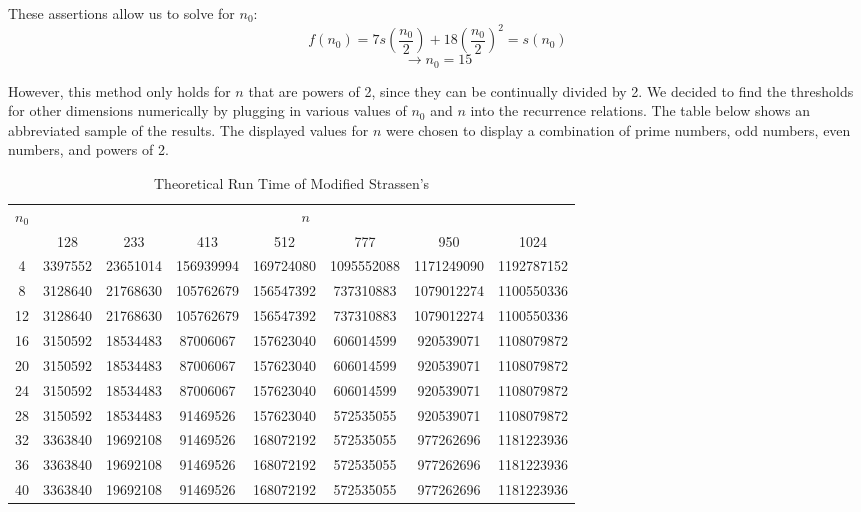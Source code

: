 \documentclass[12pt]{article}
\begin{document}
These assertions allow us to solve for $n_0$:
$$f(n_0) = 7s\left(\frac{n_0}{2}\right) + 18\left(\frac{n_0}{2}\right)^2 = s(n_0)$$
$$\longrightarrow n_0 = 15$$

However, this method only holds for $n$ that are powers of 2, since they can be continually divided by 2. We decided to find the thresholds for other dimensions numerically by plugging in various values of $n_0$ and $n$ into the recurrence relations. The table below shows an abbreviated sample of the results. The displayed values for $n$ were chosen to display a combination of prime numbers, odd numbers, even numbers, and powers of 2.\\

\begin{table}[h!]
\centering
\renewcommand{\arraystretch}{1.2}
{\setlength{\tabcolsep}{5pt}
\begin{tabular}{c|c|c|c|c|c|c|c}
\multirow{2}{*}{$n_0$} & \multicolumn{7}{c}{$n$}\\ \cline{2-8}
& 128 & 233 & 413 & 512 & 777 & 950 & 1024 \\ \hline
4 & 3397552 & 23651014 & 156939994 & 169724080 & 1095552088 & 1171249090 & 1192787152 \\
8 & \cellcolor{green}3128640 & 21768630 & 105762679 & \cellcolor{green}156547392 & 737310883 & 1079012274 & \cellcolor{green}1100550336 \\
12 & \cellcolor{green}3128640 & 21768630 & 105762679 & \cellcolor{green}156547392 & 737310883 & 1079012274 & \cellcolor{green}1100550336 \\
16 & 3150592 & \cellcolor{green}18534483 & \cellcolor{green}87006067 & 157623040 & 606014599 & \cellcolor{green}920539071 & 1108079872 \\
20 & 3150592 & \cellcolor{green}18534483 & \cellcolor{green}87006067 & 157623040 & 606014599 & \cellcolor{green}920539071 & 1108079872 \\
24 & 3150592 & \cellcolor{green}18534483 & \cellcolor{green}87006067 & 157623040 & 606014599 & \cellcolor{green}920539071 & 1108079872 \\
28 & 3150592 & \cellcolor{green}18534483 & 91469526 & 157623040 & \cellcolor{green}572535055 & \cellcolor{green}920539071 & 1108079872 \\
32 & 3363840 & 19692108 & 91469526 & 168072192 & \cellcolor{green}572535055 & 977262696 & 1181223936 \\
36 & 3363840 & 19692108 & 91469526 & 168072192 & \cellcolor{green}572535055 & 977262696 & 1181223936 \\
40 & 3363840 & 19692108 & 91469526 & 168072192 & \cellcolor{green}572535055 & 977262696 & 1181223936 \\
\end{tabular}}
\caption{Theoretical Run Time of Modified Strassen's}
\end{table}
\end{document}
